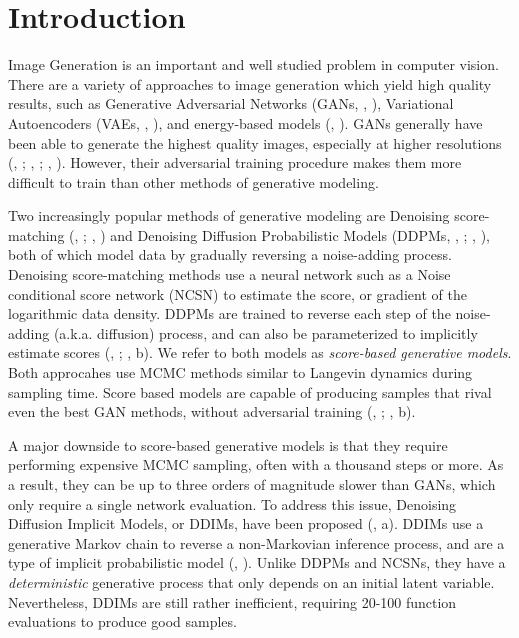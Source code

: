 \documentclass[12pt,a4paper]{article}
\newcommand{\citep}[1]{\citeauthor{#1}, \citeyear{#1}}
\begin{document}
\section{Introduction}

Image Generation is an important and well studied problem in computer vision. There are a variety of approaches to image generation which yield high quality results, such as Generative Adversarial Networks (GANs, \citep{goodfellow2014generative}), Variational Autoencoders (VAEs, \citep{kingma2014autoencoding}), and energy-based models (\citep{lecun2006tutorial}). GANs generally have been able to generate the highest quality images, especially at higher resolutions (\citep{stylegan2}; \citep{stylegan2ada}; \citep{biggan}). However, their adversarial training procedure makes them more difficult to train than other methods of generative modeling. 

Two increasingly popular methods of generative modeling are Denoising score-matching (\citep{vincent2011connection}; \citep{song2019generative}) and Denoising Diffusion Probabilistic Models (DDPMs, \citep{sohldickstein2015deep}; \citep{ddpm}), both of which model data by gradually reversing a noise-adding process. Denoising score-matching methods use a neural network such as a Noise conditional score network (NCSN) to estimate the score, or gradient of the logarithmic data density.  DDPMs are trained to reverse each step of the noise-adding (a.k.a. diffusion) process, and can also be parameterized to implicitly estimate scores (\citep{ddpm}; \citep{sde}b). We refer to both models as \textit{score-based generative models}. Both approcahes use MCMC methods similar to Langevin dynamics during sampling time. Score based models are capable of producing samples that rival even the best GAN methods, without adversarial training  (\citep{ddpm}; \citep{sde}b).

A major downside to score-based generative models is that they require performing expensive MCMC sampling, often with a thousand steps or more. As a result, they can be up to three orders of magnitude slower than GANs, which only require a single network evaluation. To address this issue, Denoising Diffusion Implicit Models, or DDIMs, have been proposed (\citep{ddim}a). DDIMs use a generative Markov chain to reverse a non-Markovian inference process, and are a type of implicit probabilistic model (\citep{mohamed2017learning}). Unlike DDPMs and NCSNs, they have a \textit{deterministic} generative process that only depends on an initial latent variable. Nevertheless, DDIMs are still rather inefficient, requiring 20-100 function evaluations to produce good samples.
\end{document}
